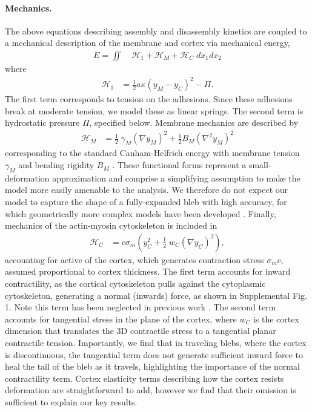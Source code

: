 \paragraph{Mechanics.}
The above equations describing assembly and disassembly kinetics are coupled to a mechanical description of the membrane and cortex via mechanical energy,
\begin{align}
E = \iint&\;   \mathcal{H}_1 + \mathcal{H}_M + \mathcal{H}_C \; dx_1 dx_2 \label{eq::energy}
\end{align}
where 
\begin{align}
\mathcal{H}_1 &= \frac{1}{2}a\kappa \left(y_M-y_C\right)^2 - \Pi.
\end{align}
The first term corresponds to tension on the adhesions. Since these adhesions break at moderate tension, we model these as linear springs. The second term is hydrostatic pressure $\Pi$, specified below. Membrane mechanics are described by
\begin{align}
\mathcal{H}_M &= \frac{1}{2}\; \gamma_M \left( \nabla y_M \right)^2 + \frac{1}{2}B_M \left( \nabla^2 y_M \right)^2 
\end{align}
corresponding to the standard Canham-Helfrich energy with membrane tension $\gamma_M$ and bending rigidity $B_M$ \cite{Helfrich:1973td,Alert:2015gz,Woolley:2014jm,Lim:2012fz}. These functional forms represent a small-deformation approximation and comprise a simplifying assumption to make the model more easily amenable to the analysis. We therefore do not expect our model to capture the shape of a fully-expanded bleb with high accuracy, for which geometrically more complex models have been developed \cite{Woolley:2015jn}. Finally, mechanics of the actin-myosin cytoskeleton is included in
\begin{align}
\mathcal{H}_C &= c\sigma_m \left( y_C^2 + \frac{1}{2}\; w_C \left( \nabla y_C \right)^2 \right), 
\end{align}
accounting for active of the cortex, which generates contraction stress $\sigma_m c$, assumed proportional to cortex thickness. The first term accounts for inward contractility, as the cortical cytoskeleton pulls against the cytoplasmic cytoskeleton, generating a normal (inwards) force, {as shown in  Supplemental Fig. 1}. Note this term has been neglected in previous work \cite{Lim:2012fz}. The second term accounts for tangential stress in the plane of the cortex, where $w_C$ is the cortex dimension that translates the 3D contractile stress to a tangential planar contractile tension. Importantly, we find that in traveling blebs, where the cortex is discontinuous, the tangential term does not generate sufficient inward force to heal the tail of the bleb as it travels, highlighting the importance of the normal contractility term. Cortex elasticity terms describing how the cortex resists deformation are straightforward to add, however we find that their omission is sufficient to explain our key results. 

